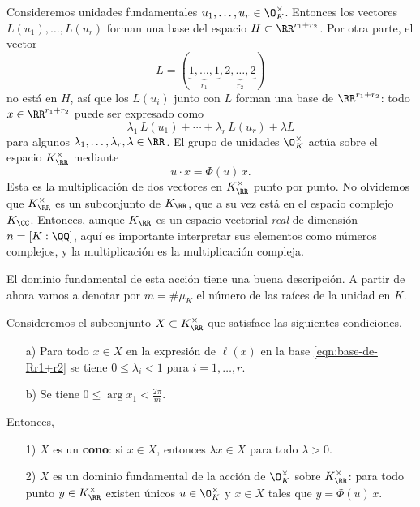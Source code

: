 \vspace{1em}

Consideremos unidades fundamentales $u_1, \ldots, u_r \in \O_K^\times$. Entonces
los vectores $L (u_1), \ldots, L (u_r)$ forman una base del espacio
$H \subset \RR^{r_1+r_2}$. Por otra parte, el vector
$$L = (\underbrace{1,\ldots,1}_{r_1}, \underbrace{2,\ldots,2}_{r_2})$$
no está en $H$, así que los $L (u_i)$ junto con $L$ forman una base de
$\RR^{r_1+r_2}$: todo $x \in \RR^{r_1+r_2}$ puede ser expresado como
\begin{equation}
  \label{eqn:base-de-Rr1+r2}
  \lambda_1 \, L (u_1) + \cdots + \lambda_r \, L (u_r) + \lambda L
\end{equation}
para algunos $\lambda_1,\ldots,\lambda_r,\lambda \in \RR$.
El grupo de unidades $\O_K^\times$ actúa sobre el espacio $K_\RR^\times$ mediante
$$u \cdot x = \Phi (u)\,x.$$
Esta es la multiplicación de dos vectores en $K_\RR^\times$ punto por punto.
No olvidemos que $K_\RR^\times$ es un subconjunto de $K_\RR$, que a su vez está
en el espacio complejo $K_\CC$. Entonces, aunque $K_\RR$ es un espacio
vectorial \emph{real} de dimensión $n = [K : \QQ]$, aquí es importante
interpretar sus elementos como números complejos, y la multiplicación es
la multiplicación compleja.

El dominio fundamental de esta acción tiene una buena descripción.  A partir de
ahora vamos a denotar por $m = \# \mu_K$ el número de las raíces de la unidad en
$K$.

\begin{teorema}
  \label{thm:X-dominio-fundamental-de-OK*}
  Consideremos el subconjunto $X \subset K_\RR^\times$ que satisface las
  siguientes condiciones.
  \begin{enumerate}
  \item[a)] Para todo $x \in X$ en la expresión de $\ell (x)$ en la base
    \eqref{eqn:base-de-Rr1+r2} se tiene $0 \le \lambda_i < 1$ para
    $i = 1,\ldots,r$.

  \item[b)] Se tiene $0 \le \arg x_1 < \frac{2\pi}{m}$.
  \end{enumerate}

  Entonces,
  \begin{enumerate}
  \item[1)] $X$ es un \textbf{cono}: si $x \in X$, entonces $\lambda x \in X$
    para todo $\lambda > 0$.

  \item[2)] $X$ es un dominio fundamental de la acción de $\O_K^\times$ sobre
    $K_\RR^\times$: para todo punto $y \in K_\RR^\times$ existen únicos
    $u \in \O_K^\times$ y $x \in X$ tales que $y = \Phi (u)\,x$.
  \end{enumerate}
\end{teorema}

